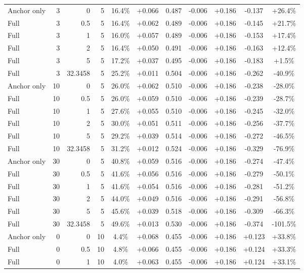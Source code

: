 \begin{table}[htbp]
\begin{tabular}{lrrrccccccc}
Anchor only & 3 & 0 & 5 & 16.4\% & +0.066 & 0.487 & -0.006 & +0.186 & -0.137 & +26.4\% \\
Full & 3 & 0.5 & 5 & 16.4\% & +0.062 & 0.489 & -0.006 & +0.186 & -0.145 & +21.7\% \\
Full & 3 & 1 & 5 & 16.0\% & +0.057 & 0.489 & -0.006 & +0.186 & -0.153 & +17.4\% \\
Full & 3 & 2 & 5 & 16.4\% & +0.050 & 0.491 & -0.006 & +0.186 & -0.163 & +12.4\% \\
Full & 3 & 5 & 5 & 17.2\% & +0.037 & 0.495 & -0.006 & +0.186 & -0.183 & +1.5\% \\
Full & 3 & 32.3458 & 5 & 25.2\% & +0.011 & 0.504 & -0.006 & +0.186 & -0.262 & -40.9\% \\
Anchor only & 10 & 0 & 5 & 26.0\% & +0.062 & 0.510 & -0.006 & +0.186 & -0.238 & -28.0\% \\
Full & 10 & 0.5 & 5 & 26.0\% & +0.059 & 0.510 & -0.006 & +0.186 & -0.239 & -28.7\% \\
Full & 10 & 1 & 5 & 27.6\% & +0.055 & 0.510 & -0.006 & +0.186 & -0.245 & -32.0\% \\
Full & 10 & 2 & 5 & 30.0\% & +0.051 & 0.511 & -0.006 & +0.186 & -0.256 & -37.7\% \\
Full & 10 & 5 & 5 & 29.2\% & +0.039 & 0.514 & -0.006 & +0.186 & -0.272 & -46.5\% \\
Full & 10 & 32.3458 & 5 & 31.2\% & +0.012 & 0.524 & -0.006 & +0.186 & -0.329 & -76.9\% \\
Anchor only & 30 & 0 & 5 & 40.8\% & +0.059 & 0.516 & -0.006 & +0.186 & -0.274 & -47.4\% \\
Full & 30 & 0.5 & 5 & 41.6\% & +0.056 & 0.516 & -0.006 & +0.186 & -0.279 & -50.1\% \\
Full & 30 & 1 & 5 & 41.6\% & +0.054 & 0.516 & -0.006 & +0.186 & -0.281 & -51.2\% \\
Full & 30 & 2 & 5 & 44.0\% & +0.049 & 0.516 & -0.006 & +0.186 & -0.291 & -56.8\% \\
Full & 30 & 5 & 5 & 45.6\% & +0.039 & 0.518 & -0.006 & +0.186 & -0.309 & -66.3\% \\
Full & 30 & 32.3458 & 5 & 49.6\% & +0.013 & 0.530 & -0.006 & +0.186 & -0.374 & -101.5\% \\
Anchor only & 0 & 0 & 10 & 4.4\% & +0.068 & 0.455 & -0.006 & +0.186 & +0.123 & +33.8\% \\
Full & 0 & 0.5 & 10 & 4.8\% & +0.066 & 0.455 & -0.006 & +0.186 & +0.124 & +33.3\% \\
Full & 0 & 1 & 10 & 4.0\% & +0.063 & 0.455 & -0.006 & +0.186 & +0.124 & +33.1\% \\

\end{tabular}
\end{table}
